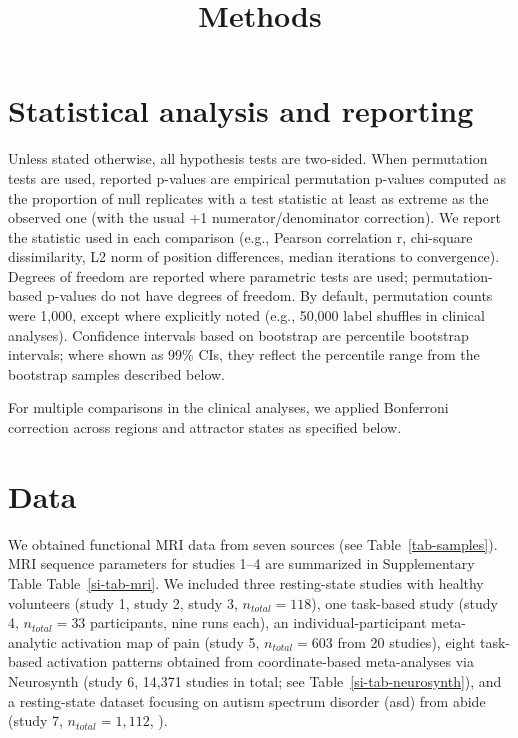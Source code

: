 \documentclass{article}
\title{Methods}
\date{\displaydate{articleDate}}
\author{}
\begin{document}
\maketitle


\keywords{}

\section{Statistical analysis and reporting}

Unless stated otherwise, all hypothesis tests are two-sided. When permutation tests are used, reported p-values are empirical permutation p-values computed as the proportion of null replicates with a test statistic at least as extreme as the observed one (with the usual +1 numerator/denominator correction). We report the statistic used in each comparison (e.g., Pearson correlation r, chi-square dissimilarity, L2 norm of position differences, median iterations to convergence). Degrees of freedom are reported where parametric tests are used; permutation-based p-values do not have degrees of freedom. By default, permutation counts were 1,000, except where explicitly noted (e.g., 50,000 label shuffles in clinical analyses). Confidence intervals based on bootstrap are percentile bootstrap intervals; where shown as 99\% CIs, they reflect the percentile range from the bootstrap samples described below.

For multiple comparisons in the clinical analyses, we applied Bonferroni correction across regions and attractor states as specified below.

\section{Data}

We obtained functional MRI data from seven sources (see Table~\ref{tab-samples}). MRI sequence parameters for studies 1--4 are summarized in Supplementary Table Table~\ref{si-tab-mri}.
We included three resting-state studies with healthy volunteers (study 1, study 2, study 3, $n_{total}=118$), one task-based study (study 4, $n_{total}=33$ participants, nine runs each), an individual-participant meta-analytic activation map of pain (study 5, $n_{total}=603$ from 20 studies), eight task-based activation patterns obtained from coordinate-based meta-analyses via Neurosynth (study 6, 14,371 studies in total; see Table~\ref{si-tab-neurosynth}), and a resting-state dataset focusing on autism spectrum disorder (\acrshort{asd}) from \acrshort{abide} (study 7, $n_{total}=1,112$, \cite{di2014autism}).
\end{document}
